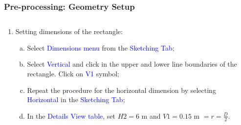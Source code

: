 \documentclass[10pt,compress]{beamer}
\newcommand{\frc}{\displaystyle\frac}
\newcommand{\blue}{\textcolor{blue}}
\begin{document}
 
\begin{frame}
 \frametitle{Pre-processing: Geometry Setup} 
    \begin{columns}
       \begin{column}[l]{0.5\linewidth}
          \begin{enumerate}\scriptsize\setcounter{enumi}{5}
             \item<1-> Setting dimensions of the rectangle:
                 \begin{enumerate}[a)]\scriptsize
                    \item<1-> Select \blue{Dimensions menu} from the \blue{Sketching Tab};
                    \item<1-> Select \blue{Vertical} and click in the upper and lower line boundaries of the rectangle. Click on \blue{V1} symbol;
                    \item<1-> Repeat the procedure for the horizontal dimension by selecting \blue{Horizontal} in the \blue{Sketching Tab};
                    \item<1-> In the \blue{Details View table}, set $H2 = 6$ m and $V1 = 0.15$ m $= r = \frc{D}{2}$.
                 \end{enumerate}
          \end{enumerate}
       \end{column}
       \begin{column}[l]{0.5\linewidth}
\end{column}
\end{columns}
\end{frame}
\end{document}
